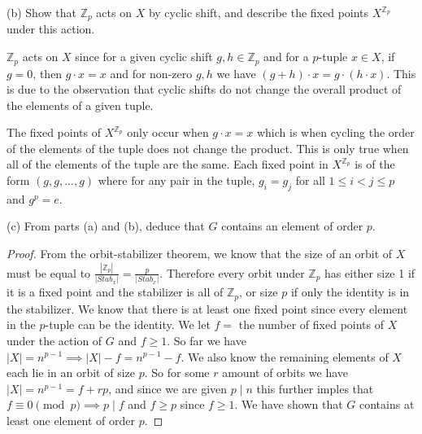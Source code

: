 \documentclass{article}
\theoremstyle{plain} %
\theoremstyle{definition} %
\begin{document}
\noindent (b) Show that $\mathbb{Z}_p$ acts on $X$ by cyclic shift,
and describe the fixed points $X^{\mathbb{Z}_p}$ under this action.

$\mathbb{Z}_p$ acts on $X$ since for a given cyclic shift $g,h \in \mathbb{Z}_p$ and
for a $p$-tuple $x \in X$, if $g=0$, then $g\cdot x= x$ and for non-zero $g,h$ we have
$(g+h) \cdot x = g \cdot (h \cdot x)$. This is due to the observation that
cyclic shifts do not change the overall product of the elements of a given tuple.

The fixed points of $X^{\mathbb{Z}_p}$ only occur when
$g \cdot x = x$ which is when cycling the order of the elements of the tuple
does not change the product. This is only true when all of the elements of the tuple
are the same. Each fixed point in $X^{\mathbb{Z}_p}$ is of the form 
$(g,g,...,g)$ where for any pair in the tuple, $g_i = g_j$ for all $1 \leq i < j \leq p$ and
$g^p = e$.

\noindent (c) From parts (a) and (b), deduce that $G$ contains an element
of order $p$.

\begin{proof}
From the orbit-stabilizer theorem, we know that the size of an orbit of $X$ must
be equal to $\frac{|\mathbb{Z}_p|}{|Stab_x|} = \frac{p}{|Stab_x|}$.
Therefore every orbit under $\mathbb{Z}_p$ has either size 1 if it is a fixed point and the
stabilizer is all of $\mathbb{Z}_p$, or size $p$ if only
the identity is in the stabilizer. We know that there
is at least one fixed point since every element in the $p$-tuple can be the identity. We let $f =$ the number of fixed points
of $X$ under the action of $G$ and $f \geq 1$. So far we have $|X| = n^{p-1} \implies |X| - f = n^{p-1} - f$.
We also know the remaining elements of $X$ each lie in an orbit of size $p$. So for some $r$ amount
of orbits we have $|X| = n^{p-1} = f + rp$, and since we are
given $p \mid n$ this further imples that $f \equiv 0 \pmod{p} \implies p \mid f$
and $f \geq p$ since $f \geq 1$. We have shown that $G$ contains at least one
element of order $p$.
\end{proof}
\end{document}
